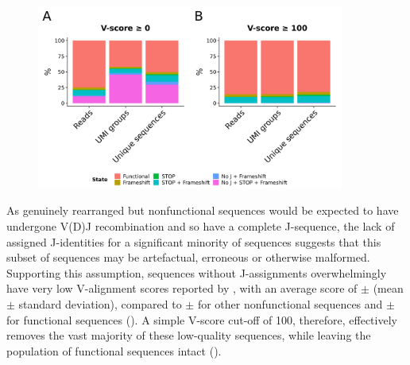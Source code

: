 \begin{figure}
\centering
\includegraphics[width = 0.9\textwidth]{_Figures/png/pilot-functional-prop}
\begin{subfigure}{0em}
\label{fig:igseq-pilot-functional-prop-a}
\end{subfigure}
\begin{subfigure}{0em}
\label{fig:igseq-pilot-functional-prop-b}
\end{subfigure}
\label{fig:igseq-pilot-functional-prop}
\end{figure}

As genuinely rearranged but nonfunctional sequences would be expected to have undergone V(D)J recombination and so have a complete J-sequence, the lack of assigned J-identities for a significant minority of sequences suggests that this subset of sequences may be artefactual, erroneous or otherwise malformed. Supporting this assumption, sequences without J-assignments overwhelmingly have very low V-alignment scores reported by , with an average score of  $\pm$  (mean $\pm$ standard deviation), compared to  $\pm$  for other nonfunctional sequences and  $\pm$  for functional sequences (). A simple V-score cut-off of 100, therefore, effectively removes the vast majority of these low-quality sequences, while leaving the population of functional sequences intact ().

